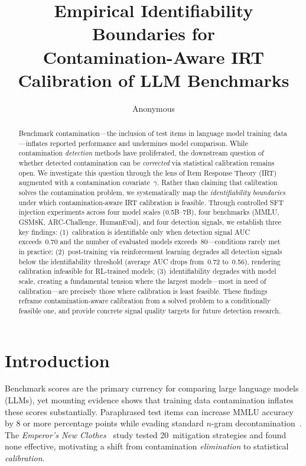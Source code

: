 \documentclass[letterpaper, 10pt, twocolumn]{article}
\title{Empirical Identifiability Boundaries for\\Contamination-Aware IRT Calibration of LLM Benchmarks}
\author{Anonymous}\date{}
\begin{document}
\maketitle

\begin{abstract}
Benchmark contamination---the inclusion of test items in language model training data---inflates reported performance and undermines model comparison.
While contamination \emph{detection} methods have proliferated, the downstream question of whether detected contamination can be \emph{corrected} via statistical calibration remains open.
We investigate this question through the lens of Item Response Theory (IRT) augmented with a contamination covariate~$\gamma$.
Rather than claiming that calibration solves the contamination problem, we systematically map the \emph{identifiability boundaries} under which contamination-aware IRT calibration is feasible.
Through controlled SFT injection experiments across four model scales (0.5B--7B), four benchmarks (MMLU, GSM8K, ARC-Challenge, HumanEval), and four detection signals, we establish three key findings:
(1)~calibration is identifiable only when detection signal AUC exceeds~0.70 and the number of evaluated models exceeds~80---conditions rarely met in practice;
(2)~post-training via reinforcement learning degrades all detection signals below the identifiability threshold (average AUC drops from~0.72 to~0.56), rendering calibration infeasible for RL-trained models;
(3)~identifiability degrades with model scale, creating a fundamental tension where the largest models---most in need of calibration---are precisely those where calibration is least feasible.
These findings reframe contamination-aware calibration from a solved problem to a conditionally feasible one, and provide concrete signal quality targets for future detection research.
\end{abstract}

\section{Introduction}

Benchmark scores are the primary currency for comparing large language models (LLMs), yet mounting evidence shows that training data contamination inflates these scores substantially.
Paraphrased test items can increase MMLU accuracy by 8 or more percentage points while evading standard $n$-gram decontamination~\citep{yang2023rethinking}.
The \emph{Emperor's New Clothes}~\citep{oren2025emperor} study tested 20~mitigation strategies and found none effective, motivating a shift from contamination \emph{elimination} to statistical \emph{calibration}.
\end{document}
